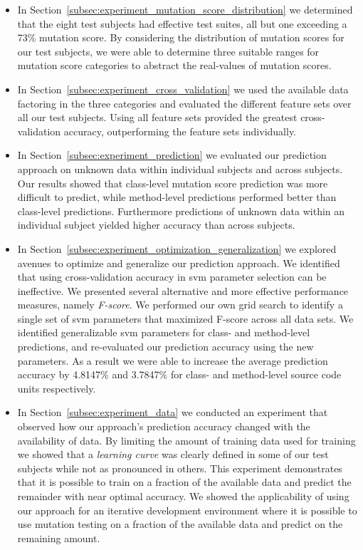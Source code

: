 \begin{itemize}
  \item In Section~\ref{subsec:experiment_mutation_score_distribution} we determined that the eight test subjects had effective test suites, all but one exceeding a 73\% mutation score. By considering the distribution of mutation scores for our test subjects, we were able to determine three suitable ranges for mutation score categories to abstract the real-values of mutation scores.
  \item In Section~\ref{subsec:experiment_cross_validation} we used the available data factoring in the three categories and evaluated the different feature sets over all our test subjects. Using all feature sets provided the greatest cross-validation accuracy, outperforming the feature sets individually.
  \item In Section~\ref{subsec:experiment_prediction} we evaluated our prediction approach on unknown data within individual subjects and across subjects. Our results showed that class-level mutation score prediction was more difficult to predict, while method-level predictions performed better than class-level predictions. Furthermore predictions of unknown data within an individual subject yielded higher accuracy than across subjects.
  \item In Section~\ref{subsec:experiment_optimization_generalization} we explored avenues to optimize and generalize our prediction approach. We identified that using cross-validation accuracy in \gls{svm} parameter selection can be ineffective. We presented several alternative and more effective performance measures, namely \emph{F-score}. We performed our own grid search to identify a single set of \gls{svm} parameters that maximized F-score across all data sets. We identified generalizable \gls{svm} parameters for class- and method-level predictions, and re-evaluated our prediction accuracy using the new parameters. As a result we were able to increase the average prediction accuracy by 4.8147\% and 3.7847\% for class- and method-level source code units respectively.
  \item In Section~\ref{subsec:experiment_data} we conducted an experiment that observed how our approach's prediction accuracy changed with the availability of data. By limiting the amount of training data used for training we showed that a \emph{learning curve} was clearly defined in some of our test subjects while not as pronounced in others. This experiment demonstrates that it is possible to train on a fraction of the available data and predict the remainder with near optimal accuracy. We showed the applicability of using our approach for an iterative development environment where it is possible to use mutation testing on a fraction of the available data and predict on the remaining amount.
\end{itemize}


